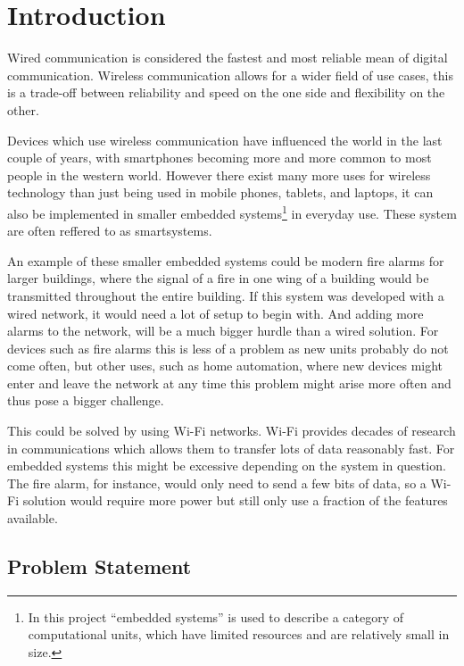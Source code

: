 \chapter{Introduction}
\vspace{-20pt}
Wired communication is considered the fastest and  most reliable mean of digital communication.
Wireless communication allows for a wider field of use cases, this is a trade-off between reliability and speed on the one side and flexibility on the other. \cite{wirelessTradeoffs}

Devices which use wireless communication have influenced the world in the last couple of years, with smartphones becoming more and more common to most people in the western world. \cite{2013-SmartPhoneUse}
However there exist many more uses for wireless technology than just being used in mobile phones, tablets, and laptops, it can also be implemented in smaller embedded systems\footnote{In this project \enquote{embedded systems} is used to describe a category of computational units, which have limited resources and are relatively small in size. } in everyday use.
These system are often reffered to as smartsystems.

An example of these smaller embedded systems could be modern fire alarms for larger buildings, where the signal of a fire in one wing of a building would be transmitted throughout the entire building.
If this system was developed with a wired network, it would need a lot of setup to begin with.
And adding more alarms to the network, will be a much bigger hurdle than a wired solution. 
For devices such as fire alarms this is less of a problem as new units probably do not come often, but other uses, such as home automation, where new devices might enter and leave the network at any time this problem might arise more often and thus pose a bigger challenge.

This could be solved by using Wi-Fi networks.
Wi-Fi provides decades of research in communications which allows them to transfer lots of data reasonably fast.
For embedded systems this might be excessive depending on the system in question.
The fire alarm, for instance, would only need to send a few bits of data, so a Wi-Fi solution would require more power but still only use a fraction of the features available.

\section{Problem Statement}\label{sec:problemStatement}

